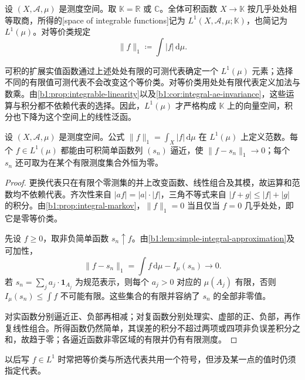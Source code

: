 \begin{definition}\label{b1:def:l1-space}
设 \((X,\mathcal A,\mu)\) 是测度空间。取 \(\mathbb K=\mathbb R\) 或 \(\mathbb C\)。全体可积函数 \(X\rightarrow\mathbb K\) 按几乎处处相等取商，所得的[space of integrable functions]记为 \(L^1(X,\mathcal A,\mu;\mathbb K)\)，也简记为 \(L^1(\mu)\)。对等价类规定
\[
\|f\|_1\coloneqq\int|f|\,\mathrm d\mu.
\]
\end{definition}

可积的扩展实值函数通过上述处处有限的可测代表确定一个 \(L^1(\mu)\) 元素；选择不同的有限值可测代表不会改变这个等价类。对等价类用处处有限代表定义加法与数乘。由\cref{b1:prop:integrable-linearity}以及\cref{b1:cor:integral-ae-invariance}，这些运算与积分都不依赖代表的选择。因此，\(L^1(\mu)\) 才严格构成 \(\mathbb K\) 上的向量空间，积分也下降为这个空间上的线性泛函。

\begin{proposition}\label{b1:prop:l1-norm-simple-density}
设 \((X,\mathcal A,\mu)\) 是测度空间。公式 \(\|f\|_1=\int_X|f|\,\mathrm d\mu\) 在 \(L^1(\mu)\) 上定义范数。每个 \(f\in L^1(\mu)\) 都能由可积简单函数列 \((s_n)\) 逼近，使 \(\|f-s_n\|_1\to0\)；每个 \(s_n\) 还可取为在某个有限测度集合外恒为零。
\end{proposition}
\begin{proof}
更换代表只在有限个零测集的并上改变函数、线性组合及其模，故运算和范数均不依赖代表。齐次性来自 \(|af|=|a|\cdot|f|\)，三角不等式来自 \(|f+g|\leq|f|+|g|\) 的积分。由\cref{b1:prop:integral-markov}，\(\|f\|_1=0\) 当且仅当 \(f=0\) 几乎处处，即它是零等价类。

先设 \(f\geq0\)，取非负简单函数 \(s_n\uparrow f\)。由\cref{b1:lem:simple-integral-approximation}及可加性，
\[
\|f-s_n\|_1=\int f\,\mathrm d\mu-I_\mu(s_n)\longrightarrow0.
\]
若 \(s_n=\sum_ja_j\cdot\mathbf1_{A_j}\) 为规范表示，则每个 \(a_j>0\) 对应的 \(\mu(A_j)\) 有限，否则 \(I_\mu(s_n)\leq\int f\) 不可能有限。这些集合的有限并容纳了 \(s_n\) 的全部非零值。

对实函数分别逼近正、负部再相减；对复函数分别处理实、虚部的正、负部，再作复线性组合。所得函数仍然简单，其误差的积分不超过两项或四项非负误差积分之和，故趋于零；各逼近函数非零区域的有限并仍有有限测度。
\end{proof}

以后写 \(f\in L^1\) 时常把等价类与所选代表共用一个符号，但涉及某一点的值时仍须指定代表。

\ProseParagraphBreak

